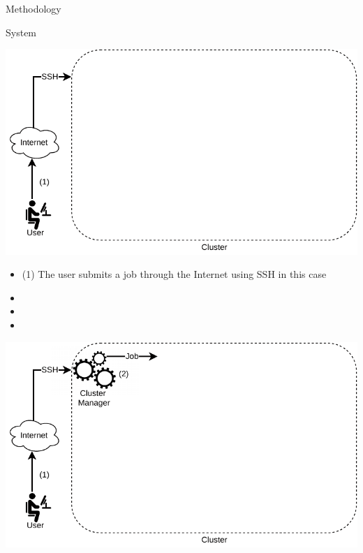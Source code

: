 \documentclass{beamer}
\begin{document}
\begin{frame}  
\begin{block}{}
\begin{center}
\Huge{Methodology}
\end{center}
\end{block}
\end{frame}

\begin{frame}{System}
\vspace{-0.7cm}
\begin{center}
    \includegraphics[scale=0.65]{SLIDES/img/System1.pdf}
\end{center}
    \begin{itemize}
    \item (1) The user submits a job through the Internet using SSH in this case
    \item[~] 
    \item[~]
    \item[~] 
    \end{itemize}
    \framebreak
\begin{center}
    \includegraphics[scale=0.65]{SLIDES/img/System2.pdf}

\end{center}
\end{frame}
\end{document}

